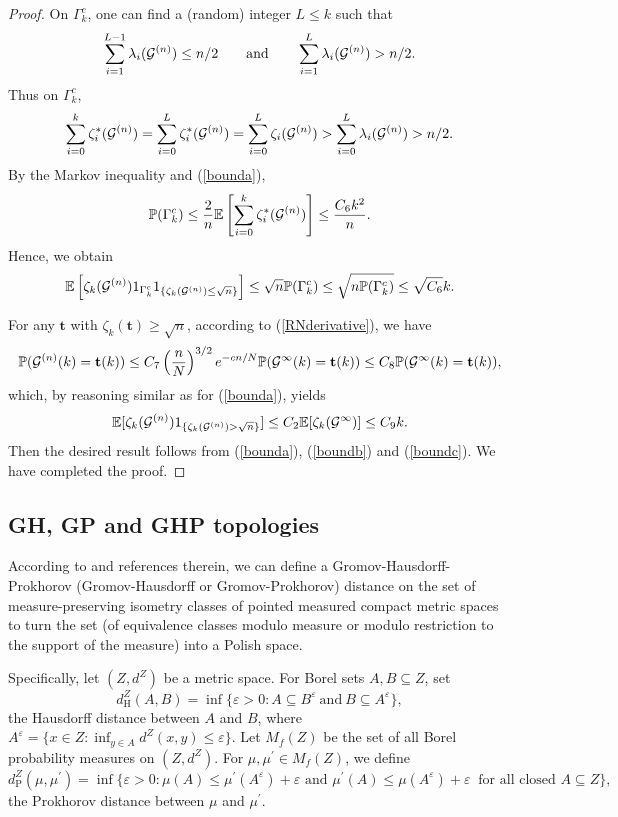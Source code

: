 \documentclass[11pt,a4paper]{article}
\newcommand{\bP}{\mathbb{P}}
\newcommand{\bE}{\mathbb{E}}
\newcommand{\ft}{\mathbf{t}}
\begin{document}
\begin{proof}
\medskip

 On $\Gamma_k^c$, one can find a (random) integer $L\leq k$ such that
$$
\sum_{i=1}^{L-1}{\lambda}_i({\cal G}^{(n)})\leq n/2\qquad\mbox{and}\qquad \sum_{i=1}^{L}{\lambda}_i({\cal G}^{(n)})> n/2.
$$
Thus on $\Gamma_k^c$,
$$
\sum_{i=0}^{k}{\zeta}_i^*({\cal G}^{(n)})=\sum_{i=0}^{L}{\zeta}_i^*({\cal G}^{(n)})=\sum_{i=0}^{L}{\zeta}_i({\cal G}^{(n)})>\sum_{i=0}^{L}{\lambda}_i({\cal G}^{(n)})> n/2.
$$
By the Markov inequality and (\ref{bounda}),
$$
\bP(\Gamma_k^c)\leq  \frac{2}{n}\bE\left[\sum_{i=0}^{k}{\zeta}_i^*({\cal G}^{(n)}) \right]\leq \frac{C_6k^2}{n}.
$$
Hence, we obtain
\begin{eqnarray}\label{boundb}
\bE\left[ \zeta_k({\cal G}^{(n)})1_{\Gamma_k^c} 1_{\{ \zeta_k({\cal G}^{(n)})\leq\sqrt{n}\}}\right]\leq \sqrt{n}\bP(\Gamma_k^c)\leq \sqrt{n \bP(\Gamma_k^c)} \leq \sqrt{C_6}k.
\end{eqnarray}

\medskip

  For any $\ft$ with $\zeta_k(\ft)\geq \sqrt{n}$, according to (\ref{RNderivative}), we have
$$\bP({\cal G}^{(n)}(k)= \ft(k))
\leq  C_7\left(\frac{n}{N}\right)^{3/2} e^{-cn/N}\bP({\cal G}^{\infty}(k)=\ft(k))\leq C_8 \bP({\cal G}^{\infty}(k)=\ft(k)),$$
which, by reasoning similar as for (\ref{bounda}),  yields
\begin{eqnarray}\label{boundc}
\bE[ \zeta_k({\cal G}^{(n)})1_{\{\zeta_k({\cal G}^{(n)})> \sqrt{n}\}}]\leq C_2 \bE[ \zeta_k({\cal G}^{\infty})]\leq C_9k.
\end{eqnarray}
Then the desired result follows from (\ref{bounda}), (\ref{boundb}) and (\ref{boundc}). We have completed the proof.\end{proof}


\subsection{GH, GP and GHP topologies}\label{secGHP}

According to \cite{EPW06,EW06,GPW,Mie09} and references therein, we can define a
Gromov-Hausdorff-Prokhorov (Gromov-Hausdorff or Gromov-Prokhorov) distance on the set of measure-preserving isometry classes of pointed measured compact metric
spaces to turn the set (of equivalence classes modulo measure or modulo restriction to the support of the measure) into a Polish space.

Specifically, let $(Z,d^Z)$ be a metric space. For Borel sets $A,B\subseteq Z$, set
$$
 d_\text{H}^Z(A,B)= \inf \{ \varepsilon >0\colon A\subseteq B^\varepsilon\
 \mathrm{and}\ B\subseteq
A^\varepsilon \},
$$
the Hausdorff distance between $A$ and $B$, where $A^\varepsilon = \{ x\in Z\colon
\inf_{y\in A} d^Z(x,y) \le \varepsilon\}$.
Let $M_{f}(Z)$ be the set of all Borel probability measures  on $(Z,d^Z)$.
For $\mu,\mu^\prime \in M_f(Z)$, we define
$$
 d_\text{P}^Z(\mu,\mu^\prime) = \inf \{ \varepsilon >0\colon \mu(A)\le \mu^\prime(A^\varepsilon) +
 \varepsilon
\text{ and }
\mu^\prime(A)\le \mu(A^\varepsilon)+\varepsilon\
\text{ for all closed } A\subseteq Z \},
$$
the Prokhorov distance between $\mu$ and $\mu^\prime$.
\end{document}
